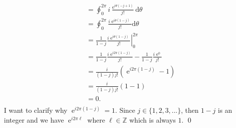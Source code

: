\documentclass[10pt]{amsart}
\newcommand{\D}{\mathrm{d}}
\DeclareMathOperator{\E}{e}
\theoremstyle{nonumberplain}
\begin{document}
\begin{enumerate}[label={\bf {\arabic*}:}]
\begin{align*}
	&=\oint_0^{2\pi} i \frac{\E^{i\theta\left( - j + 1\right)}}{j!} \D \theta \\
	&=\oint_0^{2\pi} \frac{i\E^{i\theta\left(1 - j\right)}}{j!} \D \theta \\
	&= \left. \frac{1}{1 - j} \frac{i\E^{i\theta\left(1 - j\right)}}{j!} \right|_0^{2 \pi} \\
	&= \frac{1}{1 - j} \frac{i\E^{i2\pi\left(1 - j\right)}}{j!} - \frac{1}{1 - j} \frac{i\E^0}{j!} \\
	&= \frac{i}{\left(1 - j\right)j!}\left(\E^{i2\pi\left(1 - j\right)} - 1 \right) \\
	&= \frac{i}{\left(1 - j\right)j!}\left(1 - 1 \right) \\
	&= 0. \\
\end{align*}
I want to clarify why $\E^{i2\pi\left(1 - j\right)} = 1$.
Since $j \in \{1, 2, 3, ...\}$, then $1 - j$ is an integer and we have $\E^{i2\pi \ell}$ where $\ell \in \mathbb Z$ which is always $1$.
\qed
\\


\end{enumerate}
\end{document}
